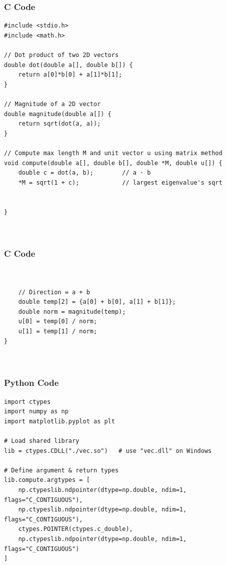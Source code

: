\documentclass{beamer}
\begin{document}
\begin{frame}[fragile]
    \frametitle{C Code  }

    \begin{lstlisting}
#include <stdio.h>
#include <math.h>

// Dot product of two 2D vectors
double dot(double a[], double b[]) {
    return a[0]*b[0] + a[1]*b[1];
}

// Magnitude of a 2D vector
double magnitude(double a[]) {
    return sqrt(dot(a, a));
}

// Compute max length M and unit vector u using matrix method
void compute(double a[], double b[], double *M, double u[]) {
    double c = dot(a, b);        // a · b
    *M = sqrt(1 + c);            // largest eigenvalue's sqrt

   
}



    \end{lstlisting}
\end{frame}

\begin{frame}[fragile]
    \frametitle{C Code  }

    \begin{lstlisting}


    // Direction = a + b
    double temp[2] = {a[0] + b[0], a[1] + b[1]};
    double norm = magnitude(temp);
    u[0] = temp[0] / norm;
    u[1] = temp[1] / norm;
}



    \end{lstlisting}
\end{frame}


\begin{frame}[fragile]
    \frametitle{Python Code}
    \begin{lstlisting}
import ctypes
import numpy as np
import matplotlib.pyplot as plt

# Load shared library
lib = ctypes.CDLL("./vec.so")   # use "vec.dll" on Windows

# Define argument & return types
lib.compute.argtypes = [
    np.ctypeslib.ndpointer(dtype=np.double, ndim=1, flags="C_CONTIGUOUS"),
    np.ctypeslib.ndpointer(dtype=np.double, ndim=1, flags="C_CONTIGUOUS"),
    ctypes.POINTER(ctypes.c_double),
    np.ctypeslib.ndpointer(dtype=np.double, ndim=1, flags="C_CONTIGUOUS")
]











    \end{lstlisting}
\end{frame}
\end{document}
